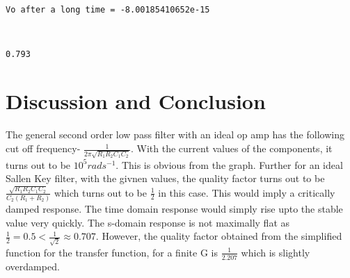 \documentclass[a4paper, 12pt, margin= 1.25cm]{article}
\begin{document}
    \begin{center}
    \end{center}
    { \hspace*{\fill} \\}
    
    \begin{Verbatim}[commandchars=\\\{\}]
Vo after a long time = -8.00185410652e-15

    \end{Verbatim}

    \begin{center}
    \end{center}
    { \hspace*{\fill} \\}
    
    \begin{Verbatim}[commandchars=\\\{\}]
0.793

    \end{Verbatim}

    \section{Discussion and Conclusion}\label{discussion-and-conclusion}

    \begin{center}
    \end{center}

\paragraph{} The general second order low pass filter with an ideal op amp has the
following cut off frequency- $\frac{1}{2 \pi \sqrt{R_1R_2C_1C_2}}$. With
the current values of the components, it turns out to be
$10^5 rads^{-1}$. This is obvious from the graph. Further for an ideal
Sallen Key filter, with the givnen values, the quality factor turns out
to be $\frac{\sqrt{R_1R_2C_1C_2}}{C_2(R_1 + R_2)}$ which turns out to be
$\frac{1}{2}$ in this case. This would imply a critically damped response.
The time domain response would simply rise upto the stable value very
quickly. The s-domain response is not maximally flat as
$\frac{1}{2} = 0.5 < \frac{1}{\sqrt{2}} \approx 0.707$. However, the
quality factor obtained from the simplified function for the transfer
function, for a finite G is $\frac{1}{2.207}$ which is slightly
overdamped.
\end{document}
